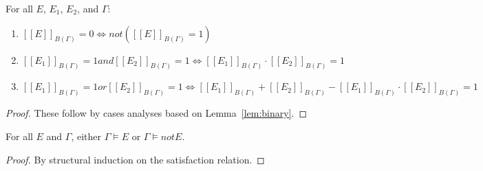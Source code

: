 \documentclass[acmsmall, review, anonymous]{acmart}\settopmatter{printfolios=true,printccs=false,printacmref=false}
\newcommand{\qqpi}[2]{[\![#2]\!]_{#1}}
\begin{document}
\begin{lemma}
For all $E$, $E_1$, $E_2$, and $\Gamma$:
\begin{enumerate}
    \item $\qqpi{B(\Gamma)}{E} = 0 \Leftrightarrow{} not (\qqpi{B(\Gamma)}{E} = 1)$
    \item $\qqpi{B(\Gamma)}{E_1} = 1 \mathrel{and} \qqpi{B(\Gamma)}{E_2} = 1 \Leftrightarrow{}  \qqpi{B(\Gamma)}{E_1} \cdot \qqpi{B(\Gamma)}{E_2} = 1$
    \item $\qqpi{B(\Gamma)}{E_1} = 1 \mathrel{or} \qqpi{B(\Gamma)}{E_2} = 1 \Leftrightarrow{}  \qqpi{B(\Gamma)}{E_1} + \qqpi{B(\Gamma)}{E_2} - \qqpi{B(\Gamma)}{E_1} \cdot \qqpi{B(\Gamma)}{E_2} = 1$
\end{enumerate}
\end{lemma}
\begin{proof}
  These follow by cases analyses based on Lemma~\ref{lem:binary}.
\end{proof}


\begin{lemma} \label{lem:models}
    For all $E$ and $\Gamma$, either $\Gamma \models E$ or $\Gamma \models{} \mathrel{not} E$.
\end{lemma}

\begin{proof}
    By structural induction on the satisfaction relation.
\end{proof}


\end{document}
